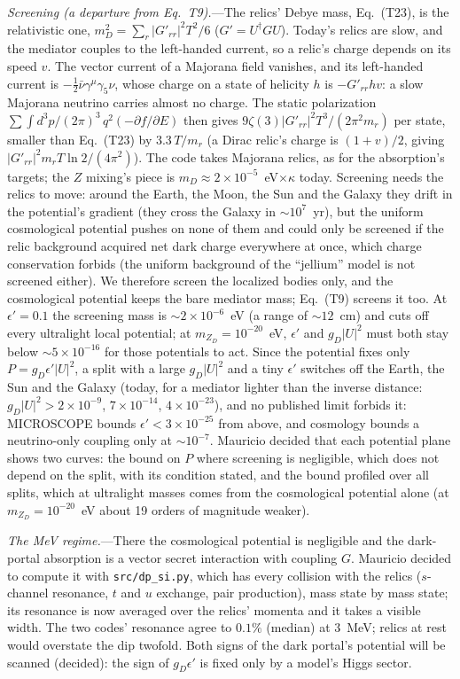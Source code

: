 \documentclass[11pt,a4paper]{article}
\newcommand{\file}[1]{\nolinkurl{#1}}
\newcommand{\mzd}{m_{Z_D}}
\newcommand{\gd}{g_D}
\newcommand{\epsp}{\epsilon'}
\begin{document}
\textit{Screening (a departure from Eq.~T9).}---The relics' Debye mass, Eq.~(T23), is the relativistic one,
$m_D^2 = \sum_r|G'_{rr}|^2T^2/6$ ($G' = U^\dagger GU$). Today's relics are slow, and the mediator couples to the
left-handed current, so a relic's charge depends on its speed $v$. The vector current of a Majorana field
vanishes, and its left-handed current is $-\tfrac12\bar\nu\gamma^\mu\gamma_5\nu$, whose charge on a state of
helicity $h$ is $-G'_{rr}hv$: a slow Majorana neutrino carries almost no charge. The static polarization
$\sum\int d^3p/(2\pi)^3\,q^2(-\partial f/\partial E)$ then gives $9\zeta(3)|G'_{rr}|^2T^3/(2\pi^2m_r)$ per
state, smaller than Eq.~(T23) by $3.3\,T/m_r$ (a Dirac relic's charge is $(1+v)/2$, giving
$|G'_{rr}|^2m_rT\ln2/(4\pi^2)$). The code takes Majorana relics, as for the absorption's targets; the $Z$
mixing's piece is $m_D\approx2\times10^{-5}$~eV$\times\kappa$ today. Screening needs the relics to move:
around the Earth, the Moon, the Sun and the Galaxy they drift in the potential's gradient (they cross the
Galaxy in $\sim10^7$~yr), but the uniform cosmological potential pushes on none of them and could only be
screened if the relic background acquired net dark charge everywhere at once, which charge conservation
forbids (the uniform background of the ``jellium'' model is not screened either). We therefore screen the
localized bodies only, and the cosmological potential keeps the bare mediator mass; Eq.~(T9) screens it too.
At $\epsp = 0.1$ the screening mass is $\sim2\times10^{-6}$~eV (a range of $\sim12$~cm) and cuts off every
ultralight local potential; at $\mzd = 10^{-20}$~eV, $\epsp$ and $\gd|U|^2$ must both stay below
$\sim5\times10^{-16}$ for those potentials to act. Since the potential fixes only $P = \gd\epsp|U|^2$, a split
with a large $\gd|U|^2$ and a tiny $\epsp$ switches off the Earth, the Sun and the Galaxy (today, for a mediator
lighter than the inverse distance: $\gd|U|^2 > 2\times10^{-9}$, $7\times10^{-14}$, $4\times10^{-23}$), and no
published limit forbids it: MICROSCOPE bounds $\epsp < 3\times10^{-25}$ from above, and cosmology bounds a
neutrino-only coupling only at $\sim10^{-7}$. Mauricio decided that each potential plane shows two curves: the bound
on $P$ where screening is negligible, which does not depend on the split, with its condition stated, and the bound
profiled over all splits, which at ultralight masses comes from the cosmological potential alone (at
$\mzd = 10^{-20}$~eV about 19 orders of magnitude weaker).

\textit{The MeV regime.}---There the cosmological potential is negligible and the dark-portal absorption
is a vector secret interaction with coupling $G$. Mauricio decided to compute it with \file{src/dp_si.py},
which has every collision with the relics ($s$-channel resonance, $t$ and $u$ exchange, pair production),
mass state by mass state; its resonance is now averaged over the relics' momenta and it takes a visible
width. The two codes' resonance agree to $0.1\%$ (median) at $3$~MeV; relics at rest would overstate the dip
twofold. Both signs of the dark portal's potential will be scanned (decided): the sign of $\gd\epsp$ is fixed
only by a model's Higgs sector.
\end{document}
